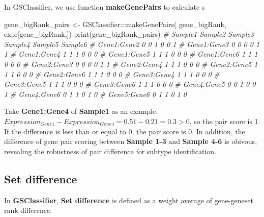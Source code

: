 \documentclass[
  12pt,
]{book}
\newenvironment{Shaded}{\begin{snugshade}}{\end{snugshade}}
\newcommand{\CommentTok}[1]{\textcolor[rgb]{0.56,0.35,0.01}{\textit{#1}}}
\newcommand{\FunctionTok}[1]{\textcolor[rgb]{0.00,0.00,0.00}{#1}}
\newcommand{\NormalTok}[1]{#1}
\newcommand{\OtherTok}[1]{\textcolor[rgb]{0.56,0.35,0.01}{#1}}
\newcommand{\SpecialCharTok}[1]{\textcolor[rgb]{0.00,0.00,0.00}{#1}}
\begin{document}
In GSClassifier, we use function \textbf{makeGenePairs} to calculate s

\begin{Shaded}
\begin{Highlighting}[]
\NormalTok{gene\_bigRank\_pairs }\OtherTok{\textless{}{-}}\NormalTok{ GSClassifier}\SpecialCharTok{:::}\FunctionTok{makeGenePairs}\NormalTok{(}
\NormalTok{  gene\_bigRank, }
\NormalTok{  expr[gene\_bigRank,])}
\FunctionTok{print}\NormalTok{(gene\_bigRank\_pairs)}
\CommentTok{\#             Sample1 Sample2 Sample3 Sample4 Sample5 Sample6}
\CommentTok{\# Gene1:Gene2       0       0       1       0       0       1}
\CommentTok{\# Gene1:Gene3       0       0       0       0       1       1}
\CommentTok{\# Gene1:Gene4       1       1       1       0       0       0}
\CommentTok{\# Gene1:Gene5       1       1       1       0       0       0}
\CommentTok{\# Gene1:Gene6       1       1       1       0       0       0}
\CommentTok{\# Gene2:Gene3       0       0       0       0       1       1}
\CommentTok{\# Gene2:Gene4       1       1       1       0       0       0}
\CommentTok{\# Gene2:Gene5       1       1       1       0       0       0}
\CommentTok{\# Gene2:Gene6       1       1       1       0       0       0}
\CommentTok{\# Gene3:Gene4       1       1       1       0       0       0}
\CommentTok{\# Gene3:Gene5       1       1       1       0       0       0}
\CommentTok{\# Gene3:Gene6       1       1       1       0       0       0}
\CommentTok{\# Gene4:Gene5       0       0       1       0       0       1}
\CommentTok{\# Gene4:Gene6       0       1       1       0       1       0}
\CommentTok{\# Gene5:Gene6       0       1       1       0       1       0}
\end{Highlighting}
\end{Shaded}

Take \textbf{Gene1:Gene4} of \textbf{Sample1} as an example. \(Expression_{Gene1} - Expression_{Gene4} = 0.51-0.21 = 0.3 > 0\), so the pair score is 1. If the difference is less than or equal to 0, the pair score is 0. In addition, the difference of gene pair scoring between \textbf{Sample 1-3} and \textbf{Sample 4-6} is obivous, revealing the robustness of pair difference for subtype identification.

\hypertarget{set-difference}{%
\subsection{Set difference}\label{set-difference}}

In \textbf{GSClassifier}, \textbf{Set difference} is defined as a weight average of gene-geneset rank difference.
\end{document}

